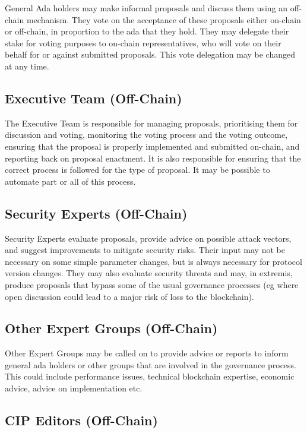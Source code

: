 General Ada holders may make informal proposals and discuss them using an off-chain mechanism.  They vote on the acceptance of these proposals
either on-chain or off-chain, in proportion to the ada that they hold.  They may delegate their stake for voting purposes to on-chain representatives,
who will vote on their behalf for or against submitted proposals.  This vote delegation may be changed at any time.

\subsection{Executive Team (Off-Chain)}

The Executive Team is responsible for managing proposals, prioritising them for discussion and voting, monitoring the voting process and the
voting outcome, ensuring that the proposal is properly implemented and submitted on-chain, and reporting back on proposal enactment.
It is also responsible for ensuring that the correct process is followed for the type of proposal.  It may be possible to automate part or all of this process.

\subsection{Security Experts (Off-Chain)}

Security Experts evaluate proposals, provide advice on possible attack vectors, and suggest improvements to mitigate security risks.
Their input may not be necessary on some simple parameter changes, but is always necessary for protocol version changes.
They may also evaluate security threats and may, in extremis, produce proposals that bypass some of the usual governance processes
(eg where open discussion could lead to a major risk of loss to the blockchain).

\subsection{Other Expert Groups (Off-Chain)}

Other Expert Groups may be called on to provide advice or reports to inform general ada holders or other groups that are involved in the
governance process.  This could include performance issues, technical blockchain expertise, economic advice, advice on implementation etc.

\subsection{CIP Editors (Off-Chain)}

